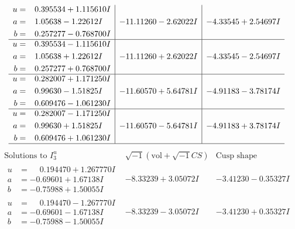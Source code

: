 \documentclass[1p]{elsarticle_modified}
\theoremstyle{definition}
\newcommand{\I}{\sqrt{-1}}
\begin{document}
$$\begin{array}{c|c|c}
\begin{aligned}
u &= \phantom{-}0.395534 + 1.115610 I \\
a &= \phantom{-}1.05638 - 1.22612 I \\
b &= \phantom{-}0.257277 - 0.768700 I\end{aligned}
 & -11.11260 - 2.62022 I & -4.33545 + 2.54697 I \\ \hline\begin{aligned}
u &= \phantom{-}0.395534 - 1.115610 I \\
a &= \phantom{-}1.05638 + 1.22612 I \\
b &= \phantom{-}0.257277 + 0.768700 I\end{aligned}
 & -11.11260 + 2.62022 I & -4.33545 - 2.54697 I \\ \hline\begin{aligned}
u &= \phantom{-}0.282007 + 1.171250 I \\
a &= \phantom{-}0.99630 - 1.51825 I \\
b &= \phantom{-}0.609476 - 1.061230 I\end{aligned}
 & -11.60570 + 5.64781 I & -4.91183 - 3.78174 I \\ \hline\begin{aligned}
u &= \phantom{-}0.282007 - 1.171250 I \\
a &= \phantom{-}0.99630 + 1.51825 I \\
b &= \phantom{-}0.609476 + 1.061230 I\end{aligned}
 & -11.60570 - 5.64781 I & -4.91183 + 3.78174 I\\
 \hline 
 \end{array}$$\newpage$$\begin{array}{c|c|c}  
\text{Solutions to }I^u_{3}& \I (\text{vol} + \sqrt{-1}CS) & \text{Cusp shape}\\
 \hline 
\begin{aligned}
u &= \phantom{-}0.194470 + 1.267770 I \\
a &= -0.69601 + 1.67138 I \\
b &= -0.75988 + 1.50055 I\end{aligned}
 & -8.33239 + 3.05072 I & -3.41230 - 0.35327 I \\ \hline\begin{aligned}
u &= \phantom{-}0.194470 - 1.267770 I \\
a &= -0.69601 - 1.67138 I \\
b &= -0.75988 - 1.50055 I\end{aligned}
 & -8.33239 - 3.05072 I & -3.41230 + 0.35327 I \\ \hline\begin{aligned}

\end{aligned}
\end{array}$$
\end{document}
